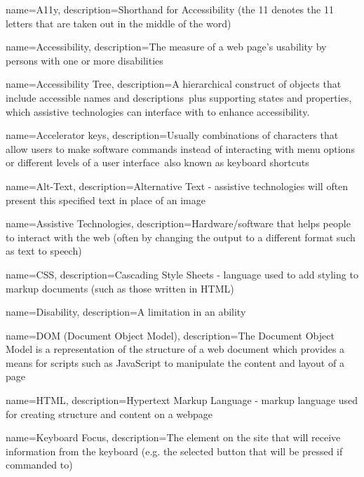 {
    name=A11y,
    description={Shorthand for Accessibility (the 11 denotes the 11 letters that are taken out in the middle of the word)}
}

{
    name=Accessibility,
    description=The measure of a web page's usability by persons with one or more disabilities
}

{
    name=Accessibility Tree,
    description=A hierarchical construct of objects that include accessible names and descriptions\, plus supporting states and properties, which assistive technologies can interface with to enhance accessibility.
}

{
    name=Accelerator keys,
    description=Usually combinations of characters that allow users to make software commands instead of interacting with menu options or different levels of a user interface\, also known as keyboard shortcuts
}

{
    name=Alt-Text,
    description={Alternative Text - assistive technologies will often present this specified text in place of an image}
}

{
    name=Assistive Technologies,
    description={Hardware/software that helps people to interact with the web (often by changing the output to a different format such as text to speech)}
}

{
    name=CSS,
    description=Cascading Style Sheets - language used to add styling to markup documents (such as those written in HTML)
}

{
    name=Disability,
    description=A limitation in an ability
}

{
    name=DOM (Document Object Model),
    description=The Document Object Model is a representation of the structure of a web document which provides a means for scripts such as JavaScript to manipulate the content and layout of a page
}

{
    name=HTML,
    description=Hypertext Markup Language - markup language used for creating structure and content on a webpage
}

{
    name=Keyboard Focus,
    description=The element on the site that will receive information from the keyboard (e.g. the selected button that will be pressed if commanded to)
}

